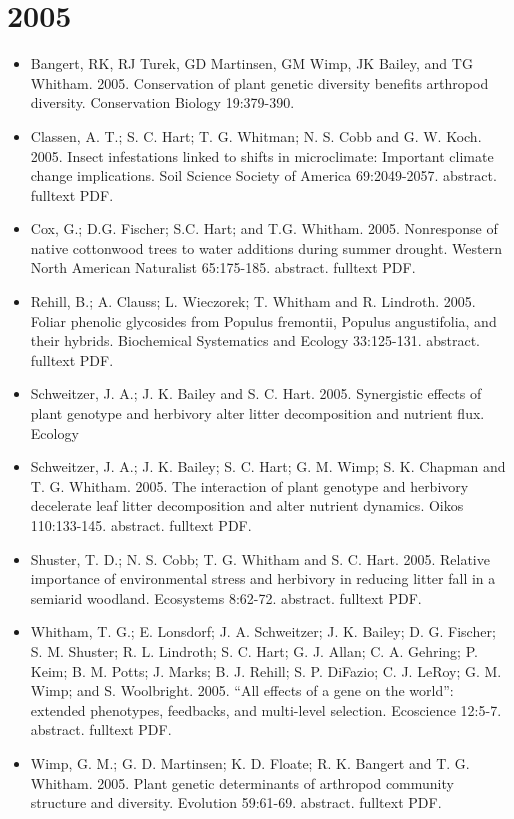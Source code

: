 \documentclass[12pt]{article}
\begin{document}
\section{2005}
\begin{itemize}
\item Bangert, RK, RJ Turek, GD Martinsen, GM Wimp, JK Bailey, and TG
Whitham. 2005. Conservation of plant genetic diversity benefits
arthropod diversity. Conservation Biology 19:379-390.
 
\item Classen, A. T.; S. C. Hart; T. G. Whitman; N. S. Cobb and
G. W. Koch. 2005. Insect infestations linked to shifts in
microclimate: Important climate change implications. Soil Science
Society of America 69:2049-2057. abstract. fulltext PDF.
 
\item Cox, G.; D.G. Fischer; S.C. Hart; and T.G. Whitham. 2005. Nonresponse
of native cottonwood trees to water additions during summer
drought. Western North American Naturalist
65:175-185. abstract. fulltext PDF.
 
\item Rehill, B.; A. Clauss; L. Wieczorek; T. Whitham and
R. Lindroth. 2005. Foliar phenolic glycosides from Populus fremontii,
Populus angustifolia, and their hybrids. Biochemical Systematics and
Ecology 33:125-131. abstract. fulltext PDF.
 
\item Schweitzer, J. A.; J. K. Bailey and S. C. Hart. 2005. Synergistic
effects of plant genotype and herbivory alter litter decomposition and
nutrient flux. Ecology
 
\item Schweitzer, J. A.; J. K. Bailey; S. C. Hart; G. M. Wimp; S. K. Chapman
and T. G. Whitham. 2005. The interaction of plant genotype and
herbivory decelerate leaf litter decomposition and alter nutrient
dynamics. Oikos 110:133-145. abstract. fulltext PDF.
 
\item Shuster, T. D.; N. S. Cobb; T. G. Whitham and
S. C. Hart. 2005. Relative importance of environmental stress and
herbivory in reducing litter fall in a semiarid woodland. Ecosystems
8:62-72. abstract. fulltext PDF.
 
\item Whitham, T. G.; E. Lonsdorf; J. A. Schweitzer; J. K. Bailey;
D. G. Fischer; S. M. Shuster; R. L. Lindroth; S. C. Hart; G. J. Allan;
C. A. Gehring; P. Keim; B. M. Potts; J. Marks; B. J. Rehill;
S. P. DiFazio; C. J. LeRoy; G. M. Wimp; and S. Woolbright. 2005. ``All
effects of a gene on the world'': extended phenotypes, feedbacks, and
multi-level selection. Ecoscience 12:5-7. abstract. fulltext PDF.
 
\item Wimp, G. M.; G. D. Martinsen; K. D. Floate; R. K. Bangert and
T. G. Whitham. 2005. Plant genetic determinants of arthropod community
structure and diversity. Evolution 59:61-69. abstract. fulltext PDF.
 
\end{itemize}
\end{document}
